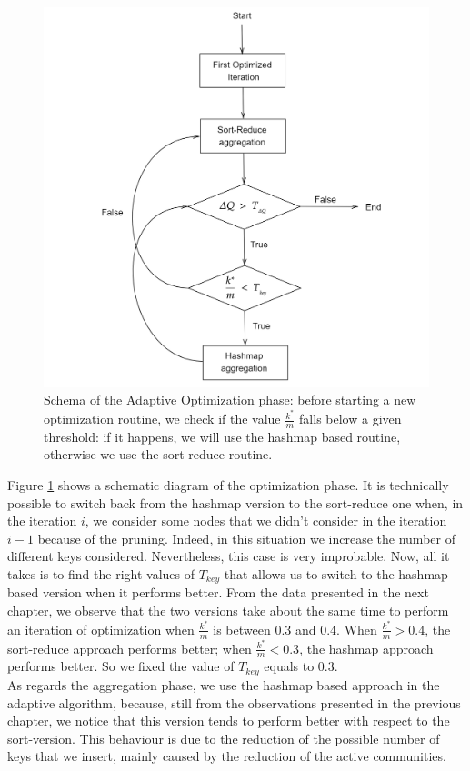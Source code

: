 \begin{figure}[t!]
	\centering
	\includegraphics[width=0.7\linewidth]{0-resources/adaptive_schema}
	\caption{Schema of the Adaptive Optimization phase: before starting a new optimization routine, we check if the value $\frac{k^*}{m}$ falls below a given threshold: if it happens, we will use the hashmap based routine, otherwise we use the sort-reduce routine.}
	\label{fig:adaptiveschema}
\end{figure}
Figure \ref{fig:adaptiveschema} shows a schematic diagram of the optimization phase. It is technically possible to switch back from the hashmap version to the sort-reduce one when, in the iteration $i$, we consider some nodes that we didn't consider in the iteration $i-1$ because of the pruning. Indeed, in this situation we increase the number of different keys considered. Nevertheless, this case is very improbable. Now, all it takes is to find the right values of $T_{key}$ that allows us to switch to the hashmap-based version when it performs better. From the data presented in the next chapter, we observe that the two versions take about the same time to perform an iteration of optimization when $\frac{k^*}{m}$ is between $0.3$ and $0.4$. When  $\frac{k^*}{m} > 0.4 $, the sort-reduce approach performs better; when  $\frac{k^*}{m} < 0.3 $, the hashmap approach performs better.
So we fixed the value of $T_{key}$ equals to $0.3$.\\
As regards the aggregation phase, we use the hashmap based approach in the adaptive algorithm, because, still from the observations presented in the previous chapter, we notice that this version tends to perform better with respect to the sort-version. This behaviour is due to the reduction of the possible number of keys that we insert, mainly caused by the reduction of the active communities.
